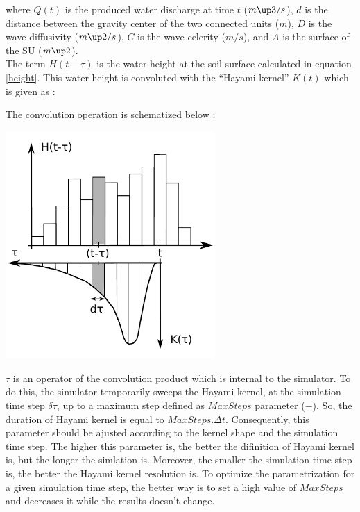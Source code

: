 

where $Q(t)$ is the produced water discharge at time $t$ ($m\up3/s$), $d$ is the distance between the gravity center of the two connected units ($m$), $D$ is the wave diffusivity ($m\up2/s$), $C$ is the wave celerity ($m/s$), and $A$ is the surface of the SU ($m\up2$).\\

The term $H(t-\tau)$ is the water height at the soil surface calculated in equation \ref{height}. This water height is convoluted with the ``Hayami kernel'' $K(t)$ which is given as :



The convolution operation is schematized below :

\includegraphics[width=8cm]{common/Convolution_HayamiSU.pdf}

$\tau$ is an operator of the convolution product which is internal to the simulator. To do this, the simulator temporarily sweeps the Hayami kernel, at the simulation time step $\delta \tau$, up to a maximum step defined as $MaxSteps$ parameter ($-$). So, the duration of Hayami kernel is equal to $MaxSteps.\Delta t$. Consequently, this parameter should be ajusted according to the kernel shape and the simulation time step. The higher this parameter is, the better the difinition of Hayami kernel is, but the longer the simlation is. Moreover, the smaller the simulation time step is, the better the Hayami kernel resolution is. To optimize the parametrization for a given simulation time step, the better way is to set a high value of $MaxSteps$ and decreases it while the results doesn't change.\\

